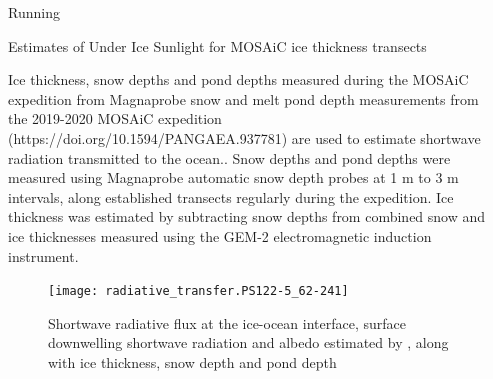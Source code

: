 \documentclass[final]{beamer}
\newlength{\sepwidth}
\newlength{\colwidth}
\newcommand{\separatorcolumn}{\begin{column}{\sepwidth}\end{column}}
\begin{document}
\begin{frame}[t,fragile]
\begin{columns}[t]
\begin{column}{\colwidth}
\begin{exampleblock}{Running }
    
  \end{exampleblock}

  \begin{block}{Estimates of Under Ice Sunlight for MOSAiC ice thickness transects}

    Ice thickness, snow depths and pond depths measured during
    the MOSAiC expedition from Magnaprobe snow and melt pond depth
    measurements from the 2019-2020 MOSAiC expedition
    (https://doi.org/10.1594/PANGAEA.937781) \cite{itkin_sea_2023} are used to estimate shortwave radiation transmitted to the ocean..
    Snow depths and pond depths were measured using Magnaprobe
    automatic snow depth probes at 1 m to 3 m intervals, along established transects regularly
    during the expedition.  Ice thickness was estimated by subtracting
    snow depths from combined snow and ice thicknesses measured using
    the GEM-2 electromagnetic induction instrument.

    \begin{figure}[h]
      \texttt{[image: radiative\_transfer.PS122-5\_62-241]}
      \caption{Shortwave radiative flux at the ice-ocean interface, surface downwelling shortwave radiation and albedo estimated by , along with ice thickness, snow depth and pond depth}
    \end{figure}
      

  \end{block}

  
\end{column}
\separatorcolumn



\end{columns}
\end{frame}
\end{document}
